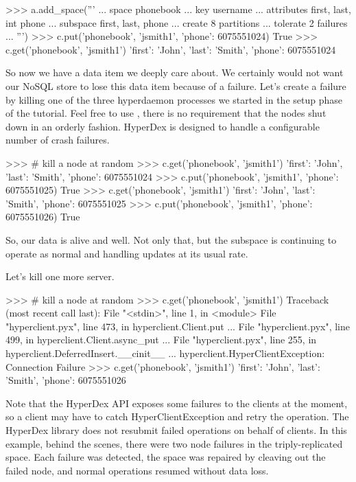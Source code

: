 \begin{pythoncode}
>>> a.add_space('''
... space phonebook
... key username
... attributes first, last, int phone
... subspace first, last, phone
... create 8 partitions
... tolerate 2 failures
... ''')
>>> c.put('phonebook', 'jsmith1', {'phone': 6075551024})
True
>>> c.get('phonebook', 'jsmith1')
{'first': 'John', 'last': 'Smith', 'phone': 6075551024}
\end{pythoncode}

So now we have a data item we deeply care about. We certainly would not want our
NoSQL store to lose this data item because of a failure. Let's create a failure
by killing one of the three hyperdaemon processes we started in the setup phase
of the tutorial. Feel free to use , there is no requirement that
the nodes shut down in an orderly fashion.  HyperDex is designed to handle a
configurable number of crash failures.

\begin{pythoncode}
>>> # kill a node at random
>>> c.get('phonebook', 'jsmith1')
{'first': 'John', 'last': 'Smith', 'phone': 6075551024}
>>> c.put('phonebook', 'jsmith1', {'phone': 6075551025})
True
>>> c.get('phonebook', 'jsmith1')
{'first': 'John', 'last': 'Smith', 'phone': 6075551025}
>>> c.put('phonebook', 'jsmith1', {'phone': 6075551026})
True
\end{pythoncode}

So, our data is alive and well. Not only that, but the subspace is continuing to
operate as normal and handling updates at its usual rate.

Let's kill one more server.

\begin{pythoncode}
>>> # kill a node at random
>>> c.get('phonebook', 'jsmith1')
Traceback (most recent call last):
File "<stdin>", line 1, in <module>
File "hyperclient.pyx", line 473, in hyperclient.Client.put ...
File "hyperclient.pyx", line 499, in hyperclient.Client.async_put ...
File "hyperclient.pyx", line 255, in hyperclient.DeferredInsert.__cinit__ ...
hyperclient.HyperClientException: Connection Failure
>>> c.get('phonebook', 'jsmith1')
{'first': 'John', 'last': 'Smith', 'phone': 6075551026}
\end{pythoncode}

Note that the HyperDex API exposes some failures to the clients at the moment,
so a client may have to catch HyperClientException and retry the operation.  The
HyperDex library does not resubmit failed operations on behalf of clients.  In
this example, behind the scenes, there were two node failures in the
triply-replicated space. Each failure was detected, the space was repaired by
cleaving out the failed node, and normal operations resumed without data loss.

